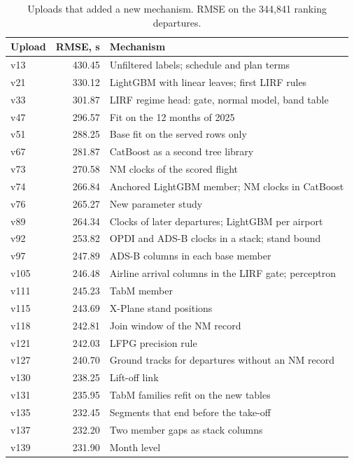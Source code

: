 \documentclass[
  manuscript=article,
  layout=preprint,
  year=2026,
  volume=x,
]{extra/joas}
\begin{document}
\begin{table}[h!]
  \centering
  \small
  \caption{Uploads that added a new mechanism. RMSE on the 344,841 ranking departures.}
  \label{tb:path}
  \begin{tabular}{lrl}
  \toprule
  \textbf{Upload} & \textbf{RMSE, s} & \textbf{Mechanism} \\
  \midrule
  v13 & 430.45 & Unfiltered labels; schedule and plan terms \\
  v21 & 330.12 & LightGBM with linear leaves; first LIRF rules \\
  v33 & 301.87 & LIRF regime head: gate, normal model, band table \\
  v47 & 296.57 & Fit on the 12 months of 2025 \\
  v51 & 288.25 & Base fit on the served rows only \\
  v67 & 281.87 & CatBoost as a second tree library \\
  v73 & 270.58 & NM clocks of the scored flight \\
  v74 & 266.84 & Anchored LightGBM member; NM clocks in CatBoost \\
  v76 & 265.27 & New parameter study \\
  v89 & 264.34 & Clocks of later departures; LightGBM per airport \\
  v92 & 253.82 & OPDI and ADS-B clocks in a stack; stand bound \\
  v97 & 247.89 & ADS-B columns in each base member \\
  v105 & 246.48 & Airline arrival columns in the LIRF gate; perceptron \\
  v111 & 245.23 & TabM member \\
  v115 & 243.69 & X-Plane stand positions \\
  v118 & 242.81 & Join window of the NM record \\
  v121 & 242.03 & LFPG precision rule \\
  v127 & 240.70 & Ground tracks for departures without an NM record \\
  v130 & 238.25 & Lift-off link \\
  v131 & 235.95 & TabM families refit on the new tables \\
  v135 & 232.45 & Segments that end before the take-off \\
  v137 & 232.20 & Two member gaps as stack columns \\
  v139 & 231.90 & Month level \\
  \bottomrule
  \end{tabular}
\end{table}
\end{document}
